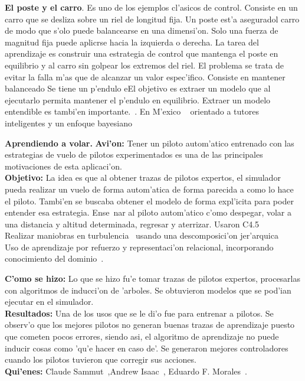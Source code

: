 \documentclass[11pt]{article}
\begin{document}
\medskip
\noindent

\textbf{El poste y el carro}. Es uno de los ejemplos cl'asicos de control. Consiste en un carro que se desliza sobre un riel de longitud fija. Un poste est'a aseguradol carro de modo que s'olo puede balancearse en una dimensi'on. Solo una fuerza de magnitud fija puede aplicrse hacia la izquierda o derecha. La tarea del aprendizaje es construir una estrategia de control que mantenga el poste en equilibrio y al carro sin golpear los extremos del riel. El problema se trata de evitar la falla m'as que de alcanzar un valor espec'ifico. Consiste en mantener balanceado Se tiene un p'endulo eEl objetivo es extraer un modelo que al ejecutarlo permita mantener el p'endulo en equilibrio. Extraer un modelo entendible es tambi'en importante.~\cite{Suc99skillmodelling}. En M'exico ~\cite{And99modellingof} orientado a tutores inteligentes y un enfoque bayesiano~\cite{freyre} 

\medskip
\noindent

\textbf{Aprendiendo a volar.} \textbf{Avi'on:} Tener un piloto autom'atico entrenado con las estrategias de vuelo de pilotos experimentados es una de las principales motivaciones de esta aplicaci'on.\\
\textbf{Objetivo:} La idea es que al obtener trazas de pilotos expertos, el simulador pueda realizar un vuelo de forma autom'atica de forma parecida a como lo hace el piloto. Tambi'en se buscaba obtener el modelo de forma expl'icita para poder entender esa estrategia. Ense~nar al piloto autom'atico c'omo despegar, volar a una distancia y altitud determinada, regresar y aterrizar. Usaron C4.5~\cite{Sammut92learningto}\\
Realizar maniobras en turbulencia~\cite{Isaac03goal-directedlearning} usando una descomposici'on jer'arquica\\
Uso de aprendizaje por refuerzo y representaci'on relacional, incorporando conocimiento del dominio~\cite{Morales04learningto}.

\textbf{C'omo se hizo:} Lo que se hizo fu'e tomar trazas de pilotos expertos, procesarlas con algoritmos de inducci'on de 'arboles. Se obtuvieron modelos que se pod'ian ejecutar en el simulador. \\
\textbf{Resultados:} Una de los usos que se le di'o fue para entrenar a pilotos. Se observ'o que los mejores pilotos no generan buenas trazas de aprendizaje puesto que cometen pocos errores, siendo asi, el algoritmo de aprendizaje no puede inducir cosas como 'qu'e hacer en caso de'. Se generaron mejores controladores cuando los pilotos tuvieron que corregir sus acciones.\\
\textbf{Qui'enes:} Claude Sammut~\cite{Sammut92learningto},Andrew Isaac~\cite{Isaac03goal-directedlearning}, Eduardo F. Morales~\cite{Morales04learningto}.
\end{document}

